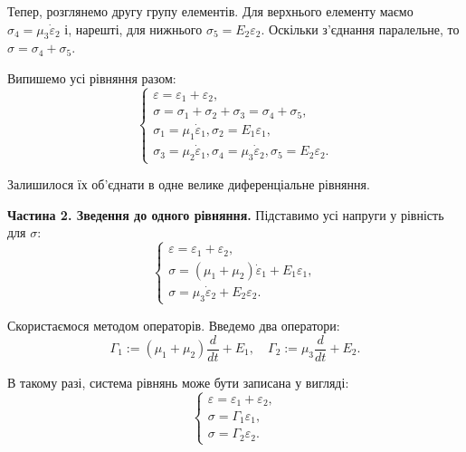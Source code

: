 \documentclass{hw_template}
\begin{document}
Тепер, розглянемо другу групу елементів. Для верхнього елементу маємо
$\sigma_4 = \mu_3\dot{\varepsilon}_2$ і, нарешті, для нижнього 
$\sigma_5 = E_2 \varepsilon_2$. Оскільки з'єднання паралельне, то 
$\sigma = \sigma_4 + \sigma_5$.

Випишемо усі рівняння разом:
\begin{equation*}
    \begin{cases}
        \varepsilon = \varepsilon_1 + \varepsilon_2, \\
        \sigma = \sigma_1 + \sigma_2 + \sigma_3 = \sigma_4 + \sigma_5, \\
        \sigma_1 = \mu_1 \dot{\varepsilon}_1, \sigma_2 = E_1 \varepsilon_1,\\
        \sigma_3 = \mu_2 \dot{\varepsilon}_1, \sigma_4 = \mu_3 \dot{\varepsilon}_2, \sigma_5 = E_2 \varepsilon_2.
    \end{cases}
\end{equation*}

Залишилося їх об'єднати в одне велике диференціальне рівняння. 

\textcolor{blue!90!white}{\textbf{Частина 2. Зведення до одного рівняння.}} Підставимо 
усі напруги у рівність для $\sigma$:
\begin{equation*}
    \begin{cases}
        \varepsilon = \varepsilon_1 + \varepsilon_2, \\
        \sigma = (\mu_1+\mu_2)\dot{\varepsilon}_1 + E_1\varepsilon_1, \\
        \sigma = \mu_3\dot{\varepsilon}_2 + E_2\varepsilon_2.
    \end{cases}
\end{equation*}

Скористаємося методом операторів. Введемо два оператори:
\begin{equation*}
    \Gamma_1 := (\mu_1+\mu_2)\frac{d}{dt} + E_1, \quad \Gamma_2 := \mu_3\frac{d}{dt} + E_2.
\end{equation*}

В такому разі, система рівнянь може бути записана у вигляді:
\begin{equation*}
    \begin{cases}
        \varepsilon = \varepsilon_1 + \varepsilon_2, \\
        \sigma = \Gamma_1\varepsilon_1, \\
        \sigma = \Gamma_2\varepsilon_2.
    \end{cases}
\end{equation*}
\end{document}
